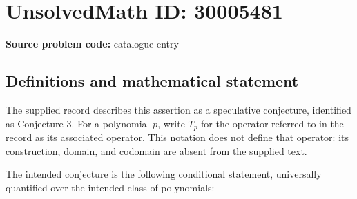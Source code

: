 \documentclass[11pt]{article}
\begin{document}
\section*{UnsolvedMath ID: 30005481}
\textbf{Source problem code:} catalogue entry
\subsection{Definitions and mathematical statement}
The supplied record describes this assertion as a speculative conjecture, identified as Conjecture 3. For a polynomial \(p\), write \(T_p\) for the operator referred to in the record as its associated operator. This notation does not define that operator: its construction, domain, and codomain are absent from the supplied text.

The intended conjecture is the following conditional statement, universally quantified over the intended class of polynomials:
\end{document}
